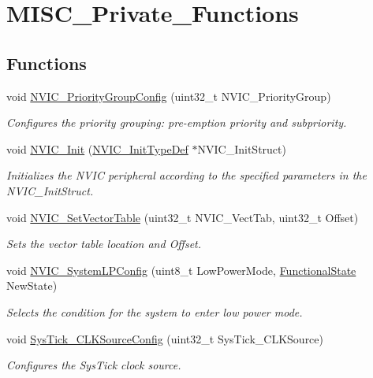 \hypertarget{group___m_i_s_c___private___functions}{}\section{M\+I\+S\+C\+\_\+\+Private\+\_\+\+Functions}
\label{group___m_i_s_c___private___functions}
\subsection*{Functions}
\begin{DoxyCompactItemize}
\item 
void \mbox{\hyperlink{group___m_i_s_c___private___functions_gadfb1f34f803ce54c976643db8c484442}{N\+V\+I\+C\+\_\+\+Priority\+Group\+Config}} (uint32\+\_\+t N\+V\+I\+C\+\_\+\+Priority\+Group)
\begin{DoxyCompactList}\small\item\em Configures the priority grouping\+: pre-\/emption priority and subpriority. \end{DoxyCompactList}\item 
void \mbox{\hyperlink{group___m_i_s_c___private___functions_ga4ab373ed0870c06fca5eb51d639adf41}{N\+V\+I\+C\+\_\+\+Init}} (\mbox{\hyperlink{struct_n_v_i_c___init_type_def}{N\+V\+I\+C\+\_\+\+Init\+Type\+Def}} $\ast$N\+V\+I\+C\+\_\+\+Init\+Struct)
\begin{DoxyCompactList}\small\item\em Initializes the N\+V\+IC peripheral according to the specified parameters in the N\+V\+I\+C\+\_\+\+Init\+Struct. \end{DoxyCompactList}\item 
void \mbox{\hyperlink{group___m_i_s_c___private___functions_ga1145208ad70edfc2fab19b8b8ef1b1a1}{N\+V\+I\+C\+\_\+\+Set\+Vector\+Table}} (uint32\+\_\+t N\+V\+I\+C\+\_\+\+Vect\+Tab, uint32\+\_\+t Offset)
\begin{DoxyCompactList}\small\item\em Sets the vector table location and Offset. \end{DoxyCompactList}\item 
void \mbox{\hyperlink{group___m_i_s_c___private___functions_gae21011c5232f5b8f366acbecd12a1d4a}{N\+V\+I\+C\+\_\+\+System\+L\+P\+Config}} (uint8\+\_\+t Low\+Power\+Mode, \mbox{\hyperlink{group___exported__types_gac9a7e9a35d2513ec15c3b537aaa4fba1}{Functional\+State}} New\+State)
\begin{DoxyCompactList}\small\item\em Selects the condition for the system to enter low power mode. \end{DoxyCompactList}\item 
void \mbox{\hyperlink{group___m_i_s_c___private___functions_ga2777d255bb06ad62bb6372a9db1ff385}{Sys\+Tick\+\_\+\+C\+L\+K\+Source\+Config}} (uint32\+\_\+t Sys\+Tick\+\_\+\+C\+L\+K\+Source)
\begin{DoxyCompactList}\small\item\em Configures the Sys\+Tick clock source. \end{DoxyCompactList}\end{DoxyCompactItemize}


